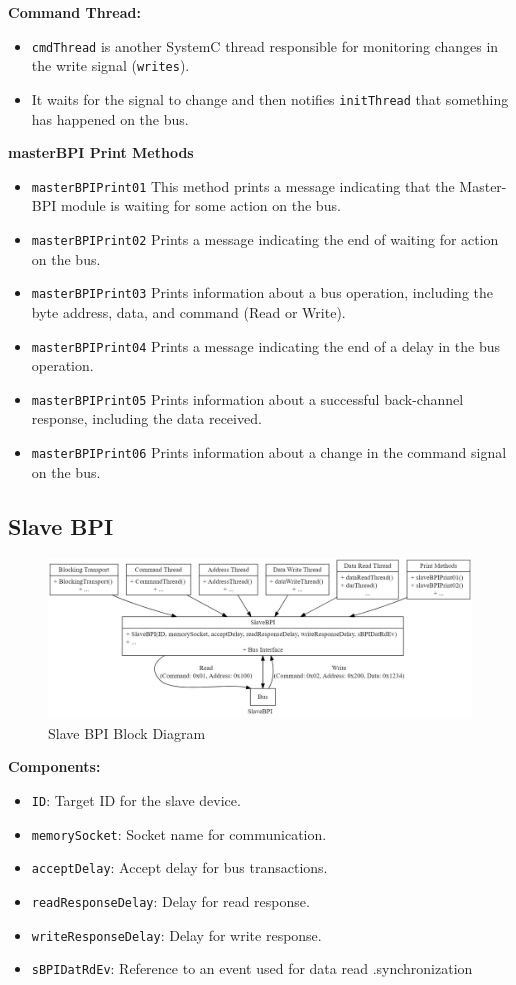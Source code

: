 \documentclass[a4paper,12pt,english]{report}
\begin{document}
\textbf{Command Thread:} 
\begin{itemize}
\item \texttt{cmdThread} is another SystemC thread responsible for monitoring changes in the write signal (\texttt{write\textunderscore s}).

\item It waits for the signal to change and then notifies \texttt{initThread} that something has happened on the bus.
\end{itemize}

\textbf {masterBPI Print Methods}
\begin{itemize}
\item \texttt {masterBPIPrint01} This method prints a message indicating that the Master-BPI module is waiting for some action on the bus.
\item \texttt {masterBPIPrint02} Prints a message indicating the end of waiting for action on the bus.
\item \texttt {masterBPIPrint03} Prints information about a bus operation, including the byte address, data, and command (Read or Write).
\item \texttt {masterBPIPrint04} Prints a message indicating the end of a delay in the bus operation.
\item \texttt {masterBPIPrint05} Prints information about a successful back-channel response, including the data received.
\item \texttt {masterBPIPrint06} Prints information about a change in the command signal on the bus.
\end{itemize}
\newpage
\subsection{Slave BPI}
\begin{figure}[h!]
\centering
\includegraphics[width=0.8\linewidth]{graphviz.png} %
\caption{Slave BPI Block Diagram}
\end{figure}

\textbf{Components:}
\begin{itemize}
    \item \texttt{ID}: Target ID for the slave device.
    \item \texttt{memorySocket}: Socket name for communication.
    \item \texttt{acceptDelay}: Accept delay for bus transactions.
    \item \texttt{readResponseDelay}: Delay for read response.
    \item \texttt{writeResponseDelay}: Delay for write response.
    \item \texttt{sBPIDatRdEv}: Reference to an event used for data read .synchronization
\end{itemize}
\end{document}
